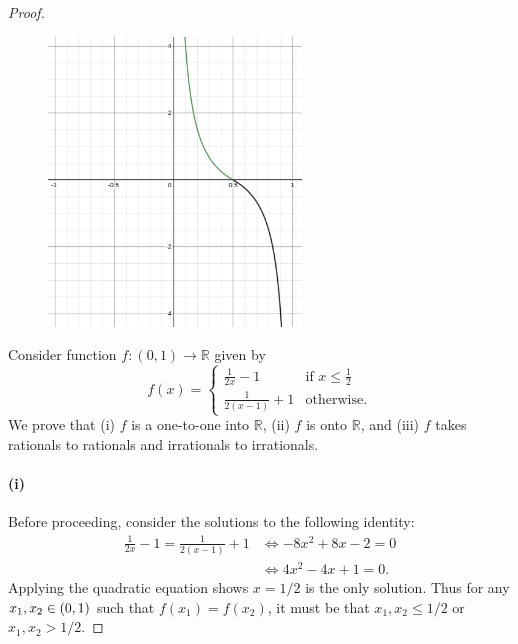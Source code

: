 \documentclass{report}
\begin{document}
  \begin{proof}

    \begin{figure}[ht]
      \label{sub:exercise-6-3-fig1}
      \includegraphics[width=0.6\textwidth]{exercise-6.3.png}
      \centering
    \end{figure}

    Consider function $f \colon (0, 1) \rightarrow \mathbb{R}$ given by
      $$f(x) = \begin{cases}
        \frac{1}{2x} - 1 & \text{if } x \leq \frac{1}{2} \\
        \frac{1}{2(x - 1)} + 1 & \text{otherwise}.
      \end{cases}$$
    We prove that (i) $f$ is a one-to-one into $\mathbb{R}$, (ii) $f$ is onto
      $\mathbb{R}$, and (iii) $f$ takes rationals to rationals and irrationals
      to irrationals.

    \paragraph{(i)}%

      Before proceeding, consider the solutions to the following identity:
        \begin{align*}
          \frac{1}{2x} - 1 = \frac{1}{2(x - 1)} + 1
          & \iff -8x^2 + 8x - 2 = 0 \\
          & \iff 4x^2 - 4x + 1 = 0.
        \end{align*}
      Applying the quadratic equation shows $x = 1 / 2$ is the only solution.
      Thus for any $x_1, x_2 \in \left(0, 1\right)$ such that $f(x_1) = f(x_2)$, it
        must be that $x_1, x_2 \leq 1 / 2$ or $x_1, x_2 > 1 / 2$.


\end{proof}
\end{document}
